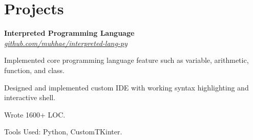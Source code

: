 \section{Projects}
    \begin{twocolentry}{
    }
    \textbf{Interpreted Programming Language}\\
    \textit{\href{https://github.com/muhhae/interpreted-lang-py}{github.com/muhhae/interpreted-lang-py}}
    \end{twocolentry}

    \vspace{0.10 cm}
    \begin{onecolentry}
        \begin{highlights}
            \item Implemented core programming language feature such as variable, arithmetic, function,
                and class.
            \item Designed and implemented custom IDE with working syntax highlighting and interactive shell.
            \item Wrote 1600+ LOC.
            \item Tools Used: Python, CustomTKinter.
        \end{highlights}
    \end{onecolentry}

    \vspace{0.2 cm}


